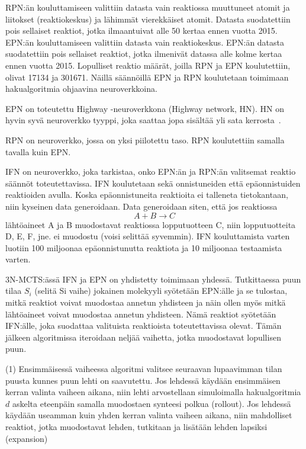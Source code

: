 \documentclass[finnish,twoside,censored,subject,sw-line]{HYthesisML}
\begin{document}
RPN:än kouluttamiseen valittiin datasta vain reaktiossa muuttuneet atomit ja liitokset (reaktiokeskus)
ja lähimmät vierekkäiset atomit. Datasta suodatettiin pois sellaiset reaktiot, jotka ilmaantuivat
alle 50 kertaa ennen vuotta 2015. EPN:än kouluttamiseen valittiin datasta vain reaktiokeskus.
EPN:än datasta suodatettiin pois sellaiset reaktiot, jotka ilmenivät datassa alle kolme kertaa ennen vuotta
2015. Lopulliset reaktio määrät, joilla RPN ja EPN koulutettiin, olivat 17134 ja 301671. Näillä säännöillä
EPN ja RPN koulutetaan toimimaan hakualgoritmia ohjaavina neuroverkkoina.

EPN on toteutettu Highway -neuroverkkona (Highway network, HN). HN on hyvin syvä neuroverkko
tyyppi, joka saattaa jopa sisältää yli sata kerrosta~\cite{VeryDeepNetworks}.

RPN on neuroverkko, jossa on yksi piilotettu taso. RPN koulutettiin samalla tavalla kuin EPN.

IFN on neuroverkko, joka tarkistaa, onko EPN:än ja RPN:än valitsemat reaktio säännöt toteutettavissa.
IFN koulutetaan sekä onnistuneiden että epäonnistuiden reaktioiden avulla. Koska epäonnistuneita
reaktioita ei talleneta tietokantaan, niin kyseinen data generoidaan. Data generoidaan siten, että jos reaktiossa
\[A  + B \rightarrow C\] lähtöaineet A ja B muodostavat reaktiossa lopputuotteen C, niin lopputuotteita
D, E, F, jne. ei muodostu (voisi selittää syvemmin). IFN kouluttamista varten luotiin 100 miljoonaa
epäonnistunutta reaktiota ja 10 miljoonaa testaamista varten.

3N-MCTS:ässä IFN ja EPN on yhdistetty toimimaan yhdessä. Tutkittaessa puun tilaa $S_i$ (selitä Si vaihe) jokainen
molekyyli syötetään EPN:älle ja se tulostaa, mitkä reaktiot voivat muodostaa annetun yhdisteen ja näin ollen
myös mitkä lähtöaineet voivat muodostaa annetun yhdisteen. Nämä reaktiot syötetään IFN:älle, joka suodattaa
valituista reaktioista toteutettavissa olevat. Tämän jälkeen algoritmissa iteroidaan neljää vaihetta, jotka
muodostavat lopullisen puun.

(1) Ensimmäisessä vaiheessa algoritmi valitsee seuraavan lupaavimman tilan puusta kunnes puun lehti on saavutettu.
Jos lehdessä käydään ensimmäisen kerran valinta vaiheen aikana, niin lehti arvostellaan simuloimalla hakualgoritmia
$d$ askelta eteenpäin samalla muodostaen synteesi polkua (rollout). Jos lehdessä käydään useamman kuin yhden
kerran valinta vaiheen aikana, niin mahdolliset reaktiot, jotka muodostavat lehden, tutkitaan ja lisätään lehden
lapsiksi (expansion)
\end{document}
